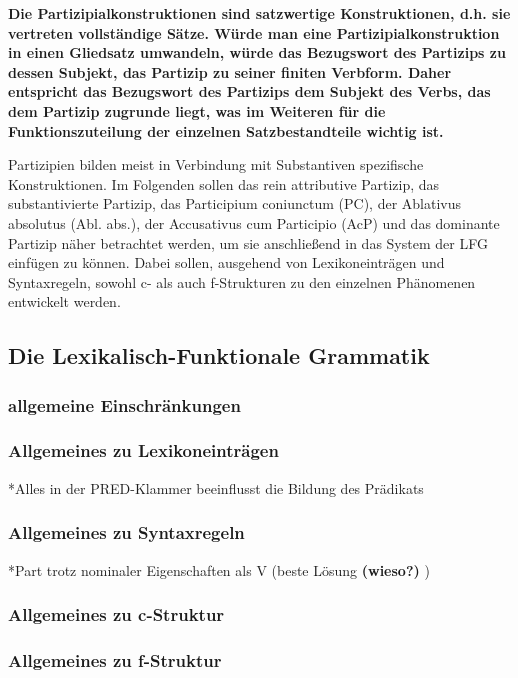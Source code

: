 \documentclass[12pt,a4paper]{article}
\begin{document}
\textbf{Die Partizipialkonstruktionen sind satzwertige Konstruktionen, d.h. sie vertreten vollständige Sätze. Würde man eine Partizipialkonstruktion in einen Gliedsatz umwandeln, würde das Bezugswort des Partizips zu dessen Subjekt, das Partizip zu seiner finiten Verbform. Daher entspricht das Bezugswort des Partizips dem Subjekt des Verbs, das dem Partizip zugrunde liegt, was im Weiteren für die Funktionszuteilung der einzelnen Satzbestandteile wichtig ist.}

Partizipien bilden meist in Verbindung mit Substantiven spezifische Konstruktionen. Im Folgenden sollen das rein attributive Partizip, das substantivierte Partizip, das Participium coniunctum (PC), der Ablativus absolutus (Abl. abs.), der Accusativus cum Participio (AcP) und das dominante Partizip näher betrachtet werden, um sie anschließend in das System der LFG einfügen zu können. Dabei sollen, ausgehend von Lexikoneinträgen und Syntaxregeln, sowohl c- als auch f-Strukturen zu den einzelnen Phänomenen entwickelt werden.
\subsection{Die Lexikalisch-Funktionale Grammatik}
\subsubsection{allgemeine Einschränkungen}
\subsubsection{Allgemeines zu Lexikoneinträgen}
*Alles in der PRED-Klammer beeinflusst die Bildung des Prädikats

\subsubsection{Allgemeines zu Syntaxregeln}
*Part trotz nominaler Eigenschaften als V (beste Lösung \textbf{(wieso?)} )
\subsubsection{Allgemeines zu c-Struktur}
\subsubsection{Allgemeines zu f-Struktur}
\end{document}
